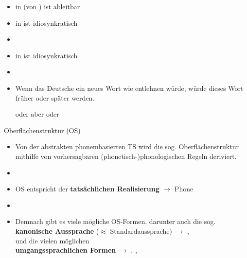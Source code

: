 \begin{frame}

\begin{itemize}
	\item \textipa{[t]} in  (von ) ist ableitbar
	\item {} in  ist idiosynkratisch
	\item[]
	\item {} in  ist idiosynkratisch
	\item[]
	\item Wenn das Deutsche ein neues Wort wie  \textipa{[k @ U d]} entlehnen würde, würde dieses Wort früher oder später  werden.
	
	\ea \textipa{[k O U t]} oder \textipa{[k o: t]} aber  oder  
	\z
	
\end{itemize}

\end{frame}



\begin{frame}{Oberflächenstruktur (OS)}

\begin{itemize}
	\item Von der abstrakten phonembasierten TS wird die sog. Oberflächenstruktur mithilfe von vorhersagbaren (phonetisch-)phonologischen Regeln deriviert.
	\item[]
	\item OS entspricht der \textbf{tatsächlichen Realisierung} $\rightarrow$ Phone \textipa{[ ]}
	\item[]
	\item Demnach gibt es viele mögliche OS-Formen, darunter auch die sog.\\ 
\textbf{kanonische Aussprache} ($\approx$ Standardaussprache) $\rightarrow$ \textipa{[P e: b @ n]},\\
und die vielen möglichen\\
\textbf{umgangssprachlichen Formen} $\rightarrow$ \textipa{[P e: b n]}, \textipa{[P e: b m]}, \textipa{[P e: m]}
\end{itemize}

\end{frame}


